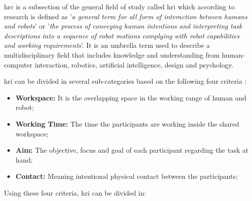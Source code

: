 
\par \ac{hrc} is a subsection of the general field of study called \ac{hri} which according to research \cite{hri.1, hri.2} is defined as '\textit{a general term for all form of interaction between humans and robots}' or '\textit{the process of conveying human intentions and interpreting task descriptions into a sequence of robot motions complying with robot capabilities and working requirements}'. It is an umbrella term used to describe a multidisciplinary field that includes knowledge and understanding from human-computer interaction, robotics, artificial intelligence, design and psychology. 

\noindent \ac{hri} can be divided in several sub-categories based on the following four criteria \cite{paper.review.1, paper.review.2}:

\begin{itemize}
    \item \textbf{Workspace: }It is the overlapping space in the working range of human and robot;
    \item \textbf{Working Time: }The time the participants are working inside the shared workspace;
    \item \textbf{Aim: }The objective, focus and goal of each participant regarding the task at hand;
    \item \textbf{Contact: }Meaning intentional physical contact between the participants;
\end{itemize}

\noindent Using these four criteria, \ac{hri} can be divided in:


